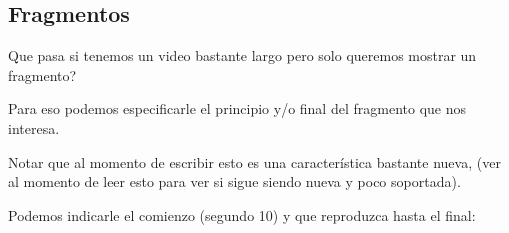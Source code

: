 \documentclass[letterpaper,10pt,spanish]{sphinxmanual}
\begin{document}
%
\begin{sphinxVerbatim}[commandchars=\\\{\}]
  
      
      

     

\end{sphinxVerbatim}




\subsection{Fragmentos}
\label{\detokenize{audio-y-video:fragmentos}}
Que pasa si tenemos un video bastante largo pero solo queremos mostrar un fragmento?

Para eso podemos especificarle el principio y/o final del fragmento que nos
interesa.

Notar que al momento de escribir esto es una característica bastante nueva, (ver  al momento de leer esto para
ver si sigue siendo nueva y poco soportada).

Podemos indicarle el comienzo (segundo 10) y que reproduzca hasta el final:

%
\begin{sphinxVerbatim}[commandchars=\\\{\}]
\end{sphinxVerbatim}
\end{document}
